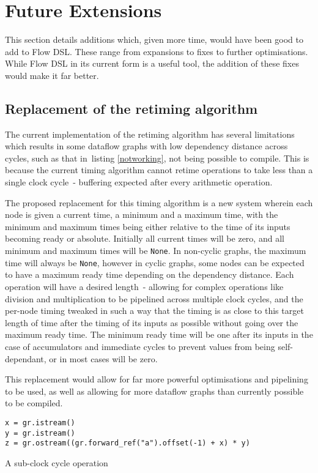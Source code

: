 \chapter{Future Extensions}
This section details additions which, given more time, would have been good to add to Flow DSL. These range from expansions to fixes to further optimisations. While Flow DSL in its current form is a useful tool, the addition of these fixes would make it far better.

\section{Replacement of the retiming algorithm}\label{ext.retime}
The current implementation of the retiming algorithm has several limitations which results in some dataflow graphs with low dependency distance across cycles, such as that in listing \ref{notworking}, not being possible to compile. This is because the current timing algorithm cannot retime operations to take less than a single clock cycle \hyphen{} buffering expected after every arithmetic operation.

The proposed replacement for this timing algorithm is a new system wherein each node is given a current time, a minimum and a maximum time, with the minimum and maximum times being either relative to the time of its inputs becoming ready or absolute. Initially all current times will be zero, and all minimum and maximum times will be \lstinline|None|. In non-cyclic graphs, the maximum time will always be \lstinline|None|, however in cyclic graphs, some nodes can be expected to have a maximum ready time depending on the dependency distance. Each operation will have a desired length \hyphen{} allowing for complex operations like division and multiplication to be pipelined across multiple clock cycles, and the per-node timing tweaked in such a way that the timing is as close to this target length of time after the timing of its inputs as possible without going over the maximum ready time. The minimum ready time will be one after its inputs in the case of accumulators and immediate cycles to prevent values from being self-dependant, or in most cases will be zero.

This replacement would allow for far more powerful optimisations and pipelining to be used, as well as allowing for more dataflow graphs than currently possible to be compiled.

\makeatletter
{}
\def\dontdofcolorbox{\renewcommand\fcolorbox[4][]{##4}}
\makeatother
\begin{listing}[H]
  \begin{verbatim}
x = gr.istream()
y = gr.istream()
z = gr.ostream((gr.forward_ref("a").offset(-1) + x) * y)
  \end{verbatim}
  \cprotect\caption{A sub-clock cycle operation}\label{notworking}
\end{listing}

